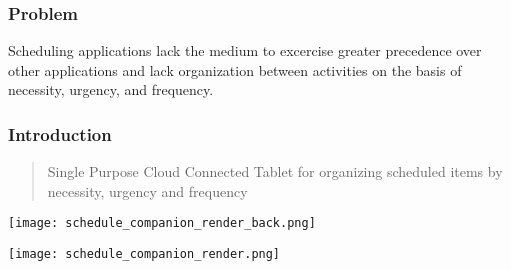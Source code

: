 \documentclass{beamer}
\begin{document}
\frame{\titlepage}

\begin{frame}
  \frametitle{Problem}
  Scheduling applications lack the medium to excercise greater precedence over other applications and lack organization between activities on the basis of necessity, urgency, and frequency.
\end{frame}

\begin{frame}
  \frametitle{Introduction}
  \begin{quote}{}
    Single Purpose Cloud Connected Tablet for organizing scheduled items by necessity, urgency and frequency
  \end{quote}

  \begin{minipage}{0.33\textwidth}
    \texttt{[image: schedule\_companion\_render\_back.png]}
  \end{minipage}
  \hfill
  \begin{minipage}{0.65\textwidth}
    \texttt{[image: schedule\_companion\_render.png]}
  \end{minipage}%

\end{frame}
\end{document}
